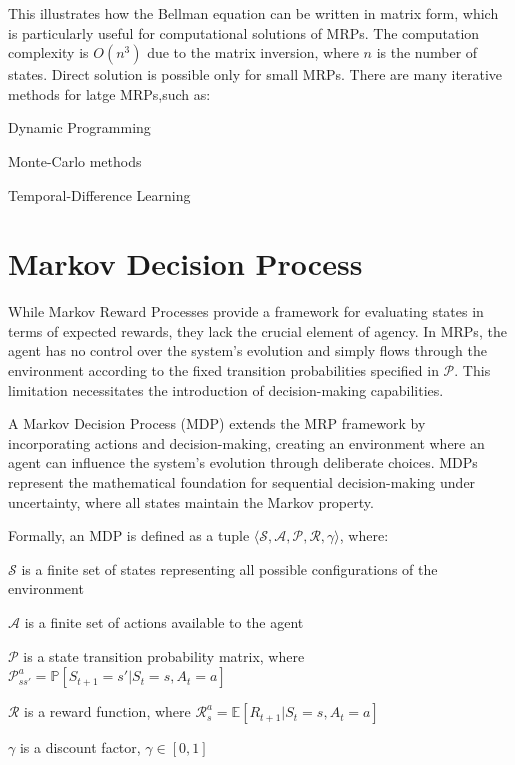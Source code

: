 This illustrates how the Bellman equation can be written in matrix form, which is particularly useful for computational solutions of MRPs. The computation complexity is $O(n^3)$ due to the matrix inversion, where $n$ is the number of states. Direct solution is possible only for small MRPs.
There are many iterative methods for latge MRPs,such as:
\begin{compactitemize}
    \item Dynamic Programming
    \item Monte-Carlo methods
    \item Temporal-Difference Learning
\end{compactitemize}


\section{Markov Decision Process}


While Markov Reward Processes provide a framework for evaluating states in terms of expected rewards, they lack the crucial element of agency. In MRPs, the agent has no control over the system's evolution and simply flows through the environment according to the fixed transition probabilities specified in $\mathcal{P}$. This limitation necessitates the introduction of decision-making capabilities.

A Markov Decision Process (MDP) extends the MRP framework by incorporating actions and decision-making, creating an environment where an agent can influence the system's evolution through deliberate choices. MDPs represent the mathematical foundation for sequential decision-making under uncertainty, where all states maintain the Markov property.

Formally, an MDP is defined as a tuple $\langle \mathcal{S}, \mathcal{A}, \mathcal{P}, \mathcal{R}, \gamma \rangle$, where:
\begin{compactitemize}
\item $\mathcal{S}$ is a finite set of states representing all possible configurations of the environment
\item $\mathcal{A}$ is a finite set of actions available to the agent
\item $\mathcal{P}$ is a state transition probability matrix, where $\mathcal{P}_{ss'}^a = \mathbb{P}[S_{t+1} = s' | S_t = s, A_t = a]$
\item $\mathcal{R}$ is a reward function, where $\mathcal{R}_s^a = \mathbb{E}[R_{t+1} | S_t = s, A_t = a]$
\item $\gamma$ is a discount factor, $\gamma \in [0,1]$
\end{compactitemize}

